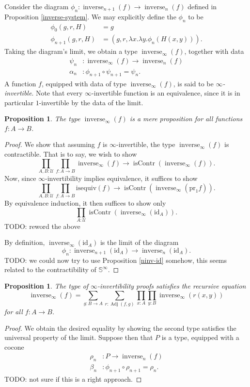 \documentclass{article}
\theoremstyle{plain}
\newtheorem{proposition}[theorem]{Proposition}
\theoremstyle{definition}
\theoremstyle{remark}
\newcommand{\id}{\mathrm{id}}
\newcommand{\isequiv}{\mathrm{isequiv}}
\newcommand{\pr}{\mathrm{pr}}
\newcommand{\nsphere}[1]{\mathbb{S}^{#1}}
\newcommand{\U}{\mathcal{U}}
\DeclareMathOperator{\inverse}{inverse}
\DeclareMathOperator{\adj}{Adj}
\DeclareMathOperator{\contr}{isContr}
\newcommand{\ninverse}[1]{\inverse_{#1}}
\begin{document}
Consider the diagram \(\phi_{n} : \ninverse{n + 1}(f) \to \ninverse{n}(f)\) defined
in Proposition \ref{inverse-system}. We may explicitly define the \(\phi_{n}\) to be
\begin{align*}
  \phi_{0}(g, r, H)     &= g \\
  \phi_{n + 1}(g, r, H) &= (g, r, \lambda x.\lambda y.\phi_{n}(H(x, y))).
\end{align*}
Taking the diagram's limit, we obtain a type \(\ninverse{\infty}(f)\), together with data
\begin{align*}
  \psi_{n}   &: \ninverse{\infty}(f) \to \ninverse{n}(f) \\
  \alpha_{n} &: \phi_{n + 1} \circ \psi_{n + 1} = \psi_{n}.
\end{align*}
A function \(f\), equipped with data of type \(\ninverse{\infty}(f)\), is said to be
\emph{\(\infty\)-invertible}.
Note that every \(\infty\)-invertible function is an equivalence, since it is in particular
\(1\)-invertible by the data of the limit.

\begin{proposition}
  The type \(\ninverse{\infty}(f)\) is a mere proposition for all functions \(f : A \to B\).
\end{proposition}

\begin{proof}
  We show that assuming \(f\) is \(\infty\)-invertible, the type \(\ninverse{\infty}(f)\) is
  contractible. That is to say, we wish to show
  \[\prod_{A, B : \U}\prod_{f : A \to B}\ninverse{\infty}(f) \to
    \contr(\ninverse{\infty}(f)).\]
  Now, since \(\infty\)-invertibility implies equivalence, it suffices to show
  \[\prod_{A, B : \U}\prod_{f : A \to B}\isequiv(f)
    \to \contr(\ninverse{\infty}(\pr_{1}f)).\]
  By equivalence induction, it then suffices to show only
  \[\prod_{A : \U}\contr(\ninverse{\infty}(\id_{A})).\]
  TODO: reword the above
  
  By definition, \(\ninverse{\infty}(\id_{A})\) is the limit of the diagram
  \[\phi_{n} : \ninverse{n + 1}(\id_{A}) \to \ninverse{n}(\id_{A}).\]
  TODO: we could now try to use Proposition \ref{ninv-id} somehow, this seems related to
  the contractibility of \(\nsphere{\infty}\).
\end{proof}

\begin{proposition}
  The type of \(\infty\)-invertibility proofs satisfies the recursive equation
  \[\ninverse{\infty}(f) =
    \sum_{g : B \to A}\sum_{r : \adj(f, g)}
    \prod_{x : A}\prod_{y : B}\ninverse{\infty}(r(x, y))\]
  for all \(f : A \to B\).
\end{proposition}

\begin{proof}
  We obtain the desired equality by showing the second type satisfies the universal property
  of the limit. Suppose then that \(P\) is a type, equipped with a cocone
  \begin{align*}
    \rho_{n}     &: P \to \ninverse{n}(f) \\
    \beta_{n} &: \phi_{n + 1} \circ \rho_{n + 1} = \rho_{n}.
  \end{align*}
  TODO: not sure if this is a right approach.
\end{proof}
\end{document}
